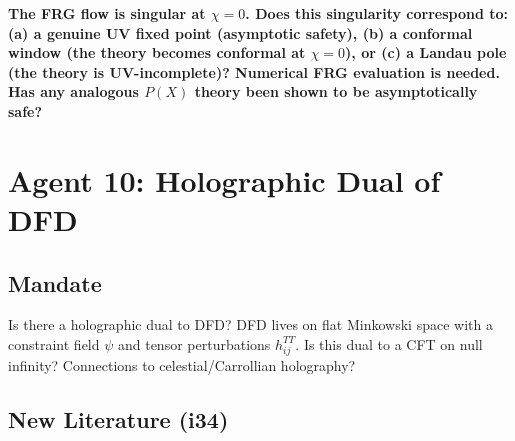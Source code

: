 \documentclass[11pt,a4paper]{article}
\begin{document}
\textbf{The FRG flow is singular at $\chi = 0$. Does this singularity correspond to: (a) a genuine UV fixed point (asymptotic safety), (b) a conformal window (the theory becomes conformal at $\chi = 0$), or (c) a Landau pole (the theory is UV-incomplete)? Numerical FRG evaluation is needed. Has any analogous $P(X)$ theory been shown to be asymptotically safe?}

\newpage

\section{Agent 10: Holographic Dual of DFD}
\label{sec:agent10}

\subsection{Mandate}

Is there a holographic dual to DFD? DFD lives on flat Minkowski space with a constraint field $\psi$ and tensor perturbations $h_{ij}^{TT}$. Is this dual to a CFT on null infinity? Connections to celestial/Carrollian holography?

\subsection{New Literature (i34)}
\end{document}
